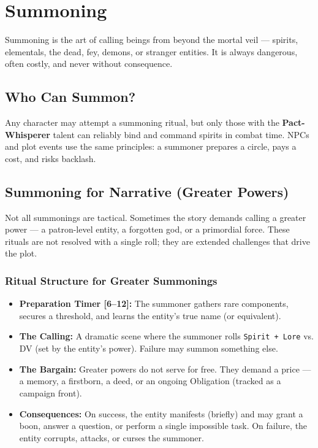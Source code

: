 
\section{Summoning}

Summoning is the art of calling beings from beyond the mortal veil --- spirits, elementals, the dead, fey, demons, or stranger entities. It is always dangerous, often costly, and never without consequence.

\subsection{Who Can Summon?}

Any character may attempt a summoning ritual, but only those with the \textbf{Pact-Whisperer} talent can reliably bind and command spirits in combat time. NPCs and plot events use the same principles: a summoner prepares a circle, pays a cost, and risks backlash.

\subsection{Summoning for Narrative (Greater Powers)}

Not all summonings are tactical. Sometimes the story demands calling a greater power --- a patron-level entity, a forgotten god, or a primordial force. These rituals are not resolved with a single roll; they are extended challenges that drive the plot.

\subsubsection{Ritual Structure for Greater Summonings}

\begin{itemize}
  \item \textbf{Preparation Timer [6--12]:} The summoner gathers rare components, secures a threshold, and learns the entity's true name (or equivalent).
  \item \textbf{The Calling:} A dramatic scene where the summoner rolls \texttt{Spirit + Lore} vs. DV (set by the entity's power). Failure may summon something else.
  \item \textbf{The Bargain:} Greater powers do not serve for free. They demand a price --- a memory, a firstborn, a deed, or an ongoing Obligation (tracked as a campaign front).
  \item \textbf{Consequences:} On success, the entity manifests (briefly) and may grant a boon, answer a question, or perform a single impossible task. On failure, the entity corrupts, attacks, or curses the summoner.
\end{itemize}

